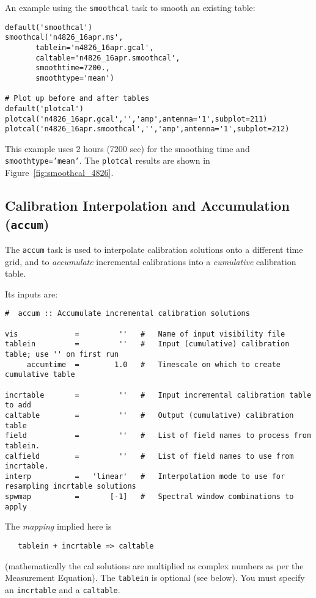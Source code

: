 An example using the {\tt smoothcal} task to smooth an existing table:
\small
\begin{verbatim}
default('smoothcal')
smoothcal('n4826_16apr.ms',
       tablein='n4826_16apr.gcal',
       caltable='n4826_16apr.smoothcal',
       smoothtime=7200.,
       smoothtype='mean')

# Plot up before and after tables
default('plotcal')
plotcal('n4826_16apr.gcal','','amp',antenna='1',subplot=211)
plotcal('n4826_16apr.smoothcal','','amp',antenna='1',subplot=212)
\end{verbatim}
\normalsize
This example uses 2 hours (7200 sec) for the smoothing time and
{\tt smoothtype='mean'}.  The {\tt plotcal} results are shown
in Figure~\ref{fig:smoothcal_4826}.


\subsection{Calibration Interpolation and Accumulation ({\tt accum})}
\label{section:cal.tables.accum}

The {\tt accum} task is used to interpolate calibration solutions 
onto a different time grid, and to {\it accumulate} incremental
calibrations into a {\it cumulative} calibration table.

Its inputs are:
\small
\begin{verbatim}
#  accum :: Accumulate incremental calibration solutions

vis             =         ''   #   Name of input visibility file
tablein         =         ''   #   Input (cumulative) calibration table; use '' on first run
     accumtime  =        1.0   #   Timescale on which to create cumulative table

incrtable       =         ''   #   Input incremental calibration table to add
caltable        =         ''   #   Output (cumulative) calibration table
field           =         ''   #   List of field names to process from tablein.
calfield        =         ''   #   List of field names to use from incrtable.
interp          =   'linear'   #   Interpolation mode to use for resampling incrtable solutions
spwmap          =       [-1]   #   Spectral window combinations to apply
\end{verbatim}
\normalsize
The {\it mapping} implied here is 
\small
\begin{verbatim}
   tablein + incrtable => caltable
\end{verbatim}
\normalsize
(mathematically the cal solutions are multiplied as complex numbers
as per the Measurement Equation).
The {\tt tablein} is optional (see below).
You must specify an {\tt incrtable} and a {\tt caltable}.

